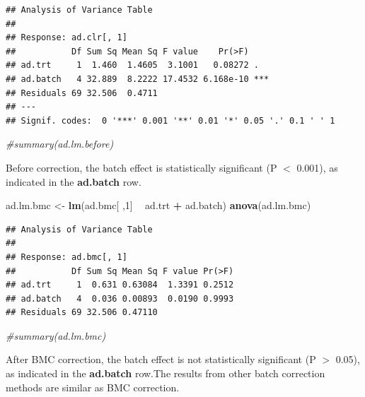 \documentclass[]{book}
\newenvironment{Shaded}{\begin{snugshade}}{\end{snugshade}}
\newcommand{\KeywordTok}[1]{\textcolor[rgb]{0.13,0.29,0.53}{\textbf{#1}}}
\newcommand{\DecValTok}[1]{\textcolor[rgb]{0.00,0.00,0.81}{#1}}
\newcommand{\StringTok}[1]{\textcolor[rgb]{0.31,0.60,0.02}{#1}}
\newcommand{\CommentTok}[1]{\textcolor[rgb]{0.56,0.35,0.01}{\textit{#1}}}
\newcommand{\OperatorTok}[1]{\textcolor[rgb]{0.81,0.36,0.00}{\textbf{#1}}}
\newcommand{\NormalTok}[1]{#1}
\begin{document}
\begin{verbatim}
## Analysis of Variance Table
## 
## Response: ad.clr[, 1]
##           Df Sum Sq Mean Sq F value    Pr(>F)    
## ad.trt     1  1.460  1.4605  3.1001   0.08272 .  
## ad.batch   4 32.889  8.2222 17.4532 6.168e-10 ***
## Residuals 69 32.506  0.4711                      
## ---
## Signif. codes:  0 '***' 0.001 '**' 0.01 '*' 0.05 '.' 0.1 ' ' 1
\end{verbatim}

\begin{Shaded}
\begin{Highlighting}[]
\CommentTok{#summary(ad.lm.before)}
\end{Highlighting}
\end{Shaded}

Before correction, the batch effect is statistically significant (P
\(<\) 0.001), as indicated in the \textbf{ad.batch} row.

\begin{Shaded}
\begin{Highlighting}[]
\NormalTok{ad.lm.bmc <-}\StringTok{ }\KeywordTok{lm}\NormalTok{(ad.bmc[ ,}\DecValTok{1}\NormalTok{] }\OperatorTok{~}\StringTok{ }\NormalTok{ad.trt }\OperatorTok{+}\StringTok{ }\NormalTok{ad.batch)}
\KeywordTok{anova}\NormalTok{(ad.lm.bmc)}
\end{Highlighting}
\end{Shaded}

\begin{verbatim}
## Analysis of Variance Table
## 
## Response: ad.bmc[, 1]
##           Df Sum Sq Mean Sq F value Pr(>F)
## ad.trt     1  0.631 0.63084  1.3391 0.2512
## ad.batch   4  0.036 0.00893  0.0190 0.9993
## Residuals 69 32.506 0.47110
\end{verbatim}

\begin{Shaded}
\begin{Highlighting}[]
\CommentTok{#summary(ad.lm.bmc)}
\end{Highlighting}
\end{Shaded}

After BMC correction, the batch effect is not statistically significant
(P \(>\) 0.05), as indicated in the \textbf{ad.batch} row.The results
from other batch correction methods are similar as BMC correction.
\end{document}
